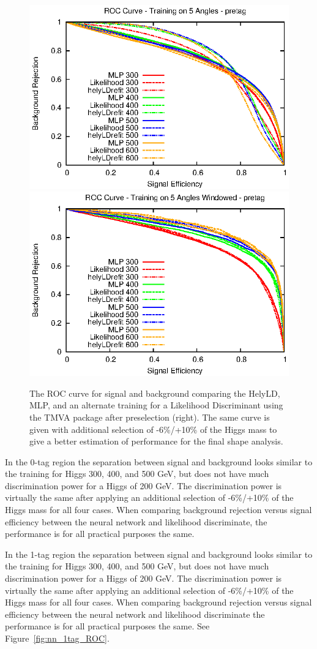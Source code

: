 \begin{figure}[htb!]
\begin{center}
\centerline{
\includegraphics[width=0.49\linewidth]{Optimization/pretag_ROC_full_5.eps}
\includegraphics[width=0.49\linewidth]{Optimization/pretag_ROC_win_5.eps}
}
\caption{The ROC curve for signal and background comparing the HelyLD, MLP, and an alternate training for a Likelihood Discriminant using the TMVA package after preselection (right).  The same curve is given with additional selection of -6\%/+10\% of the Higgs mass to give a better estimation of performance for the final shape analysis.
}
\label{fig:windowcuts}
\end{center}
\end{figure}

In the 0-tag region the separation between signal and background looks similar to the training for Higgs 300, 400, and 500 GeV, but does not have much discrimination power for a Higgs of 200 GeV.  The discrimination power is virtually the same after applying an additional selection of -6\%/+10\% of the Higgs mass for all four cases. When comparing background rejection versus signal efficiency between the neural network and likelihood discriminate, the performance is for all practical purposes the same.

In the 1-tag region the separation between signal and background looks similar to the training for Higgs 300, 400, and 500 GeV, but does not have much discrimination power for a Higgs of 200 GeV.  The discrimination power is virtually the same after applying an additional selection of -6\%/+10\% of the Higgs mass for all four cases. When comparing background rejection versus signal efficiency between the neural network and likelihood discriminate the performance is for all practical purposes the same. See Figure~\ref{fig:nn_1tag_ROC}.


